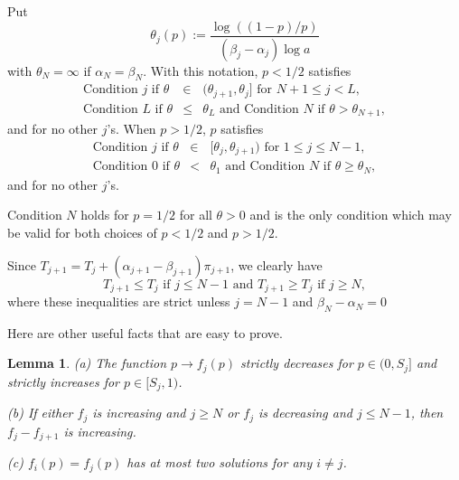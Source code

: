 \documentclass{amsart}
\newtheorem{lemma}[theorem]{Lemma}
\theoremstyle{plain}
\numberwithin{equation}{section}
\begin{document}
Put 
\begin{equation*}
   \theta _{j}(p):=\frac{\log\left( (1-p)/p \right)}{(\beta _{j}-\alpha _{j})\log a}
\end{equation*}%
with $\theta _{N}=\infty $ if $\alpha _{N}=\beta _{N}$. 
With this notation, $p<1/2$ satisfies 
\begin{eqnarray*}
    \text{Condition $j$  if }\theta  &\in &(\theta _{j+1},\theta _{j}]\text{ for }N+1\leq j<L, \\
    \text{Condition $L$ if }\theta  &\leq &\theta _{L}\text{ and Condition $N$ if }\theta >\theta _{N+1},
\end{eqnarray*}%
and for no other $j$'s. When $p>1/2$, $p$ satisfies 
\begin{eqnarray*}
   \text{Condition $j$ if }\theta  &\in &[\theta _{j},\theta _{j+1})\text{ for } 1\leq j\leq N-1, \\
    \text{Condition $0$ if }\theta  &<&\theta _{1}\text{ and Condition $N$ if }\theta \geq \theta _{N},
\end{eqnarray*}
and for no other $j$'s. 

Condition $N$ holds for $p=1/2$ for all $\theta >0$ and is the only
condition which may be valid for both choices of $p<1/2$ and $p>1/2$. 

Since $T_{j+1}=T_{j}+(\alpha _{j+1}-\beta _{j+1})\pi_{j+1}$, we
clearly have 
\begin{equation*}
  T_{j+1}\leq T_{j}\text{ if }j\leq N-1\text{ and }T_{j+1}\geq T_{j}\text{ if } j\geq N,
\end{equation*}
where these inequalities are strict unless $j=N-1$ and $\beta _{N}-\alpha_{N}=0$

Here are other useful facts that are easy to prove.

\begin{lemma}
\label{calculus}
(a) The function $p\rightarrow f_{j}(p)$ strictly decreases for $p\in (0, S_j]$ and strictly increases for $p\in [ S_j, 1)$.

(b) If either $f_{j}$ is increasing and $j\geq N$ or $f_{j}$ is decreasing
and $j\leq N-1$, then $f_{j}-f_{j+1}$ is increasing.

(c) $f_{i}(p)=f_{j}(p)$ has at most two solutions for any $i\neq j$.
\end{lemma}
\end{document}
